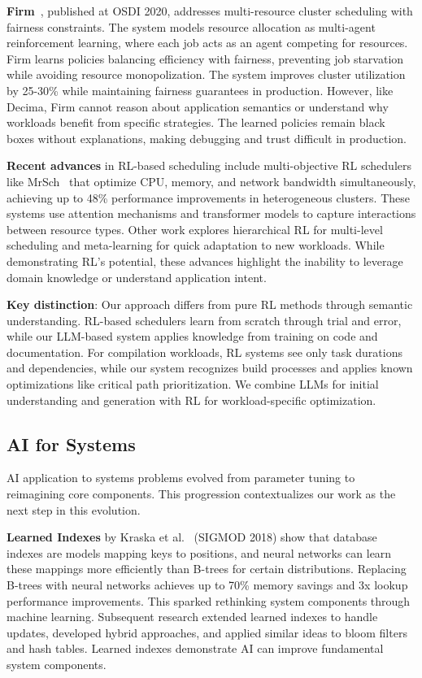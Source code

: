 \textbf{Firm}~\cite{qiu2020firm}, published at OSDI 2020, addresses multi-resource cluster scheduling with fairness constraints. The system models resource allocation as multi-agent reinforcement learning, where each job acts as an agent competing for resources. Firm learns policies balancing efficiency with fairness, preventing job starvation while avoiding resource monopolization. The system improves cluster utilization by 25-30\% while maintaining fairness guarantees in production. However, like Decima, Firm cannot reason about application semantics or understand why workloads benefit from specific strategies. The learned policies remain black boxes without explanations, making debugging and trust difficult in production.

\textbf{Recent advances} in RL-based scheduling include multi-objective RL schedulers like MrSch~\cite{zhang2024mrsch} that optimize CPU, memory, and network bandwidth simultaneously, achieving up to 48\% performance improvements in heterogeneous clusters. These systems use attention mechanisms and transformer models to capture interactions between resource types. Other work explores hierarchical RL for multi-level scheduling and meta-learning for quick adaptation to new workloads. While demonstrating RL's potential, these advances highlight the inability to leverage domain knowledge or understand application intent.

\textbf{Key distinction}: Our approach differs from pure RL methods through semantic understanding. RL-based schedulers learn from scratch through trial and error, while our LLM-based system applies knowledge from training on code and documentation. For compilation workloads, RL systems see only task durations and dependencies, while our system recognizes build processes and applies known optimizations like critical path prioritization. We combine LLMs for initial understanding and generation with RL for workload-specific optimization.

\subsection{AI for Systems}

AI application to systems problems evolved from parameter tuning to reimagining core components. This progression contextualizes our work as the next step in this evolution.

\textbf{Learned Indexes} by Kraska et al.~\cite{kraska2018learned} (SIGMOD 2018) show that database indexes are models mapping keys to positions, and neural networks can learn these mappings more efficiently than B-trees for certain distributions. Replacing B-trees with neural networks achieves up to 70\% memory savings and 3x lookup performance improvements. This sparked rethinking system components through machine learning. Subsequent research extended learned indexes to handle updates, developed hybrid approaches, and applied similar ideas to bloom filters and hash tables. Learned indexes demonstrate AI can improve fundamental system components.

